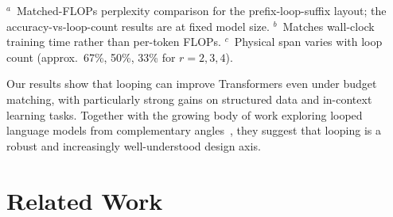 \documentclass[]{bytedance_seed}
\theoremstyle{definition}
\theoremstyle{remark}
\begin{document}
\begin{table}[t]
  \vspace{2pt}
  \raggedright\footnotesize
  $^{a}$~Matched-FLOPs perplexity comparison for the prefix-loop-suffix layout; the accuracy-vs-loop-count results are at fixed model size.\quad
  $^{b}$~Matches wall-clock training time rather than per-token FLOPs.\quad
  $^{c}$~Physical span varies with loop count (approx.\ 67\%, 50\%, 33\% for $r{=}2,3,4$).
  \end{table}
  

%
Our results show that looping can improve Transformers even under budget matching, with particularly strong gains on structured data and in-context learning tasks.
Together with the growing body of work exploring looped language models from complementary angles~\cite{geiping2025scaling,zhu2025scaling,saunshi2025reasoning,schwethelm2026recurrence,prairie2026parcae}, they suggest that looping is a robust and increasingly well-understood design axis.
\section{Related Work}
\label{sec:related-work}
\end{document}
